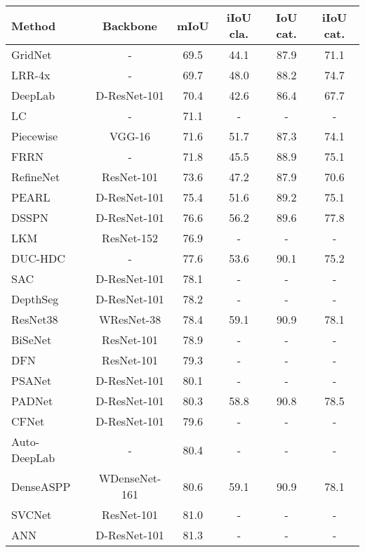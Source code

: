 \documentclass[10pt,twocolumn,letterpaper]{article}
\begin{document}
\begin{table*}[!htb]
\centering
\fontsize{7}{8}\selectfont
\setlength{\tabcolsep}{4.6pt}
\begin{tabular}{l|c|cccc}
\hline
Method       & Backbone   & mIoU  & iIoU cla. & IoU cat. & iIoU cat.  \\ \hline \hline
GridNet~\cite{Fourure2017} & -  &  69.5 &44.1 &87.9 &71.1 \\
LRR-4x & -    & 69.7 & 48.0 & 88.2 & 74.7   \\
DeepLab~\cite{Chen17} & D-ResNet-101 & 70.4 &42.6 &86.4 &67.7\\
LC    & - & 71.1 & - & - & -  \\
Piecewise~\cite{Lin2016}  & VGG-16 & 71.6 & 51.7 & 87.3 & 74.1 \\
FRRN~\cite{Pohlen2017}     & - & 71.8 & 45.5 & 88.9 & 75.1   \\
RefineNet~\cite{Lin2017} & ResNet-101 & 73.6 & 47.2 & 87.9 & 70.6   \\
PEARL~\cite{Jin2017} & D-ResNet-101 & 75.4 & 51.6 & 89.2 & 75.1   \\
DSSPN~\cite{Liang2018} & D-ResNet-101 & 76.6 & 56.2 & 89.6 & 77.8   \\
LKM~\cite{Peng2017}  & ResNet-152 & 76.9 & - & - & -   \\
DUC-HDC~\cite{Wang2018} & - & 77.6 & 53.6 & 90.1 & 75.2   \\
SAC~\cite{Zhang2017_sac}  & D-ResNet-101 & 78.1 & - & - & -  \\
DepthSeg~\cite{Kong2018}  & D-ResNet-101 & 78.2 & - & - & - \\
ResNet38~\cite{Wu2019} & WResNet-38 & 78.4 & 59.1 & 90.9 & 78.1 \\
BiSeNet~\cite{Yu2018_bisenet} & ResNet-101 & 78.9 & - & - & -   \\
DFN~\cite{Yu2018} & ResNet-101 & 79.3 & - & - & -   \\
PSANet~\cite{Zhao2018} & D-ResNet-101 & 80.1 & - & - & -   \\
PADNet~\cite{Xu2018}  & D-ResNet-101 & 80.3 & 58.8 & 90.8 & 78.5   \\
CFNet~\cite{Zhang2019}  & D-ResNet-101 & 79.6 & - & - & -   \\
Auto-DeepLab~\cite{Liu2019} & - & 80.4 & - & - & -   \\
DenseASPP~\cite{Zhao2017}  & WDenseNet-161 & 80.6 & 59.1 & 90.9 & 78.1   \\
SVCNet~\cite{Ding2019}  & ResNet-101 & 81.0 & - & - & -   \\
ANN~\cite{Zhu19_ann}  & D-ResNet-101 & 81.3 & - & - & -   \\

\end{tabular}
\end{table*}
\end{document}
